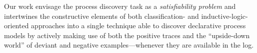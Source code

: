 Our work envisage the process discovery task as a \emph{satisfiability problem} and intertwines the constructive elements of both classification- and inductive-logic-oriented approaches into a single technique able to discover declarative process models by actively making use of both the positive traces and the ``upside-down world'' of deviant and negative examples---whenever they are available in the log. %

 


